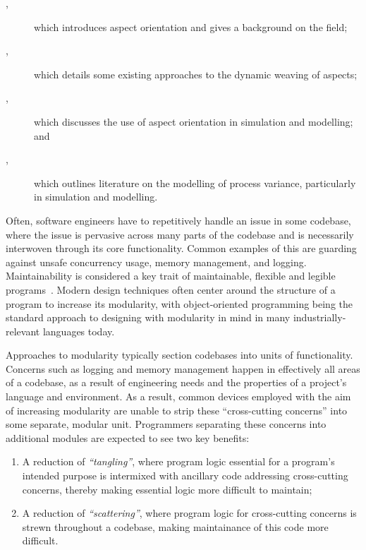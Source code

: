 \begin{description}

    \item[,] which introduces aspect orientation and
    gives a background on the field;
    \item[,] which details some existing approaches
    to the dynamic weaving of aspects;
    \item[,] which discusses the use of aspect
    orientation in simulation and modelling; and
    \item[,] which outlines literature on the modelling
    of process variance, particularly in simulation and modelling.

\end{description}



Often, software engineers have to repetitively handle an issue in some codebase,
where the issue is pervasive across many parts of the codebase and is
necessarily interwoven through its core functionality. Common examples of this
are guarding against unsafe concurrency usage, memory management, and logging.
Maintainability is considered a key trait of maintainable, flexible and legible
programs~\cite{Parnas_1972}. Modern design techniques often center around the
structure of a program to increase its modularity, with object-oriented
programming being the standard approach to designing with modularity in mind in
many industrially-relevant languages today. 

Approaches to modularity typically section codebases into units of
functionality. Concerns such as logging and memory management happen in
effectively all areas of a codebase, as a result of engineering needs and the
properties of a project's language and environment. As a result, common devices
employed with the aim of increasing modularity are unable to strip these
``cross-cutting concerns'' into some separate, modular unit. Programmers
separating these concerns into additional modules are expected to see two key
benefits:

\begin{enumerate}
    \item A reduction of \emph{``tangling''}, where program logic essential for
    a program's intended purpose is intermixed with ancillary code addressing
    cross-cutting concerns, thereby making essential logic more difficult to maintain;
    \item A reduction of \emph{``scattering''}, where program logic for
    cross-cutting concerns is strewn throughout a codebase, making maintainance
    of this code more difficult.
\end{enumerate}


